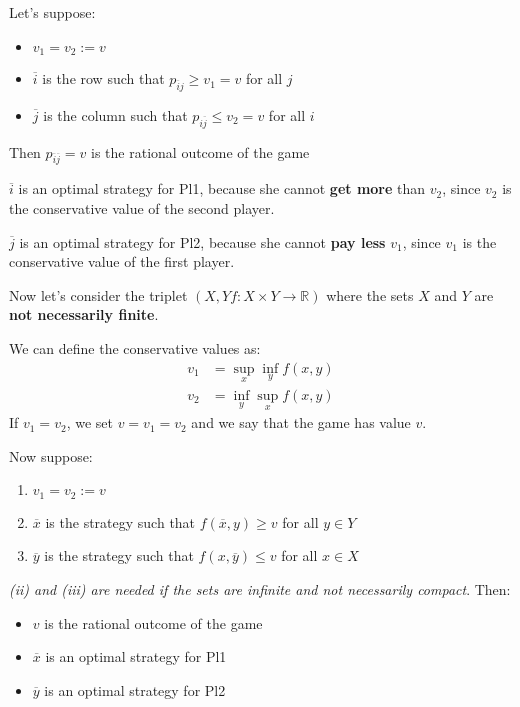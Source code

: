 \documentclass[../main.tex]{subfiles}
\begin{document}
Let's suppose:
\begin{itemize}[noitemsep]
    \item $v_1 = v_2 := v$
    \item $\overline{i}$ is the row such that $p_{\overline{i}j} \geq v_1 = v$ for all $j$
    \item $\overline{j}$ is the column such that $p_{i\overline{j}} \leq v_2 = v$ for all $i$
\end{itemize}
Then $p_{\overline{i}\overline{j}} = v$ is the rational outcome of the game
\begin{remark}
    $\overline{i}$ is an optimal strategy for Pl1, because she cannot \textbf{get more} than $v_2$, since $v_2$ is the conservative value of the second player.

    $\overline{j}$ is an optimal strategy for Pl2, because she cannot \textbf{pay less} $v_1$, since $v_1$ is the conservative value of the first player.
\end{remark}

Now let's consider the triplet $(X,Y f: X \times Y \to \mathbb{R})$ where the sets $X$ and $Y$ are \textbf{not necessarily finite}.

We can define the conservative values as:
\begin{align*}
    v_1 & = \sup_x \inf_y f(x,y) \\
    v_2 & = \inf_y \sup_x f(x,y)
\end{align*}
If $v_1 = v_2$, we set $v = v_1 = v_2$ and we say that the game has value $v$.

Now suppose:
\begin{enumerate}[label=(\roman*)]
    \item $v_1 = v_2 := v$
    \item $\overline{x}$ is the strategy such that $f(\overline{x}, y) \geq v$ for all $y \in Y$
    \item $\overline{y}$ is the strategy such that $f(x, \overline{y}) \leq v$ for all $x \in X$
\end{enumerate}

\textit{(ii) and (iii) are needed if the sets are infinite and not necessarily compact}. Then:

\begin{itemize}
    \item $v$ is the rational outcome of the game
    \item $\overline{x}$ is an optimal strategy for Pl1
    \item $\overline{y}$ is an optimal strategy for Pl2
\end{itemize}
\end{document}

